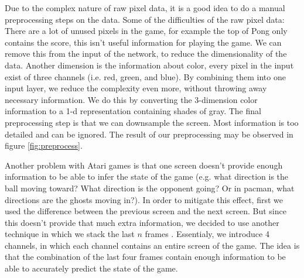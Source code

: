\documentclass{article}
\begin{document}
Due to the complex nature of raw pixel data, it is a good idea to do a manual preprocessing steps on the data. Some of the difficulties of the raw pixel data: There are a lot of unused pixels in the game, for example the top of Pong only contains the score, this isn't useful information for playing the game. We can remove this from the input of the network, to reduce the dimensionality of the data. Another dimension is the information about color, every pixel in the input exist of three channels (i.e. red, green, and blue). By combining them into one input layer, we reduce the complexity even more, without throwing away necessary information. We do this by converting the 3-dimension color information to a 1-d representation containing shades of gray. The final preprocessing step is that we can downsample the screen. Most information is too detailed and can be ignored. The result of our preprocessing may be observed in figure \ref{fig:preprocess}. 

Another problem with Atari games is that one screen doesn't provide enough information to be able to infer the state of the game (e.g. what direction is the ball moving toward? What direction is the opponent going? Or in pacman, what directions are the ghosts moving in?). In order to mitigate this effect, first we used the difference between the previous screen and the next screen. But since this doesn't provide that much extra information, we decided to use another technique in which we stack the last $n$ frames \cite{mnih2013playing}. Essentialy, we introduce 4 channels, in which each channel contains an entire screen of the game. The idea is that the combination of the last four frames contain enough information to be able to accurately predict the state of the game.
\end{document}
